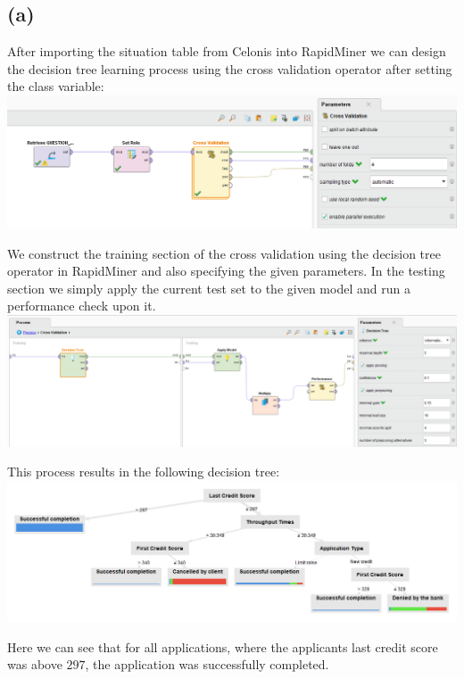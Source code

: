 \documentclass[../../main.tex]{subfiles}
\begin{document}
\subsection*{(a)}
After importing the situation table from Celonis into RapidMiner we can design the decision tree learning process using the cross validation operator after setting the class variable: \\
\includegraphics[width=\textwidth]{img/RapidMiner_Process_Overview.png}

We construct the training section of the cross validation using the decision tree operator in RapidMiner and also specifying the given parameters. In the testing section we simply apply the current test set to the given model and run a performance check upon it. \\
\includegraphics[width=\textwidth]{img/RapidMiner_Process_Cross_Validation.png}

This process results in the following decision tree: \\
\includegraphics[width=\textwidth]{img/RapidMiner_Results_Decision_Tree.png}

Here we can see that for all applications, where the applicants last credit score was above $297$, the application was successfully completed.
\end{document}
